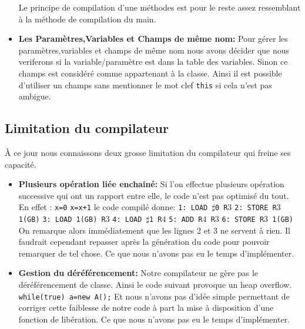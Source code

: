 \documentclass{article}
\begin{document}
\begin{itemize}
\newline 
Le principe de compilation d'une méthodes est pour le reste assez ressemblant à la méthode de compilation du main.
\item \textbf{Les Paramètres,Variables et Champs de même nom:}
\newline
Pour gérer les paramètres,variables et champs de même nom nous avons décider que nous veriferons si la variable/paramètre est dans la table des variables. Sinon ce champs est considéré comme appartenant à la classe. Ainsi il est possible d'utiliser un champs sans mentionner le mot clef \texttt{this} si cela n'est pas ambigue. 
\end{itemize}
\subsection{Limitation du compilateur}
À ce jour nous connaissons deux grosse limitation du compilateur qui freine ses capacité. 
\begin{itemize}
\item \textbf{Plusieurs opération liée enchainé:} 
\newline
Si l'on effectue plusieurs opération successive qui ont un rapport entre elle, le code n'est pas optimisé du tout. En effet : 
\newline
\texttt{x=0}
\newline
\texttt{x=x+1}
\newline
le code compilé donne:
\newline
\texttt{1: LOAD $\sharp$0 R$3$}
\newline 
\texttt{2: STORE R$3$ 1(GB)}
\newline 
\texttt{3: LOAD 1(GB) R$3$}
\newline
\texttt{4: LOAD $\sharp$1 R$4$}
\newline
\texttt{5: ADD R$4$ R$3$}
\newline
\texttt{6: STORE R$3$ 1(GB)}
\newline 
On remarque alors immédiatement que les lignes 2 et 3 ne servent à rien. Il faudrait cependant repasser après la génération du code pour pouvoir remarquer de tel chose. Ce que nous n'avons pas eu le temps d'implémenter.
\item \textbf{Gestion du déréférencement:} 
\newline
Notre compilateur ne gère pas le déréférencement de classe. Ainsi le code suivant provoque un heap overflow. 
\newline
\texttt{while(true) a=new A();}
Et nous n'avons pas d'idée simple permettant de corriger cette faiblesse de notre code à part la mise à disposition d'une fonction de libération. Ce que nous n'avons pas eu le temps d'implémenter.
\end{itemize}
\end{document}
